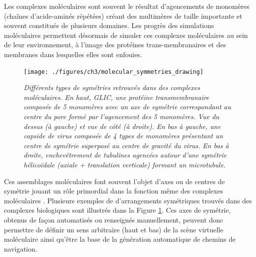 Les complexes moléculaires sont souvent le résultat d'agencements de monomères (chaînes d'acide-aminés répétées) créant des multimères de taille importante et souvent constitués de plusieurs domaines. Les progrès des simulations moléculaires permettent désormais de simuler ces complexes moléculaires au sein de leur environnement, à l'image des protéines trans-membranaires et des membranes dans lesquelles elles sont enfouies. %

\begin{figure}[h]
  \centering
  {\texttt{[image: ./figures/ch3/molecular\_symmetries\_drawing]}}
    \caption[Types de symétries retrouvées dans l'agencement de complexes protéiques majeurs.]{{\it Différents types de symétries retrouvés dans des complexes moléculaires. En haut, GLIC, une protéine transmembranaire composée de 5 monomères avec un axe de symétrie correspondant au centre du pore formé par l'agencement des 5 monomères. Vue du dessus (à gauche) et vue de côté (à droite). En bas à gauche, une capside de virus composée de 4 types de monomères présentant un centre de symétrie superposé au centre de gravité du virus. En bas à droite, enchevêtrement de tubulines agencées autour d'une symétrie hélicoïdale (axiale + translation verticale) formant un microtubule.}}
  \label{Fig:molecular_symmetries_drawing}
  \hspace{0.2cm}
\end{figure}

Ces assemblages moléculaires  font souvent l'objet d'axes ou de centres de symétrie jouant un rôle primordial dans la fonction même des complexes moléculaires \cite{goodsell_structural_2000}. Plusieurs exemples de d'arrangements symétriques trouvés dans des complexes biologiques sont illustrés dans la Figure \ref{Fig:molecular_symmetries_drawing}. Ces axes de symétrie, obtenus de façon automatisés ou renseignés manuellement, peuvent donc permettre de définir un sens arbitraire (haut et bas) de la scène virtuelle moléculaire ainsi qu'être la base de la génération automatique de chemins de navigation. 


